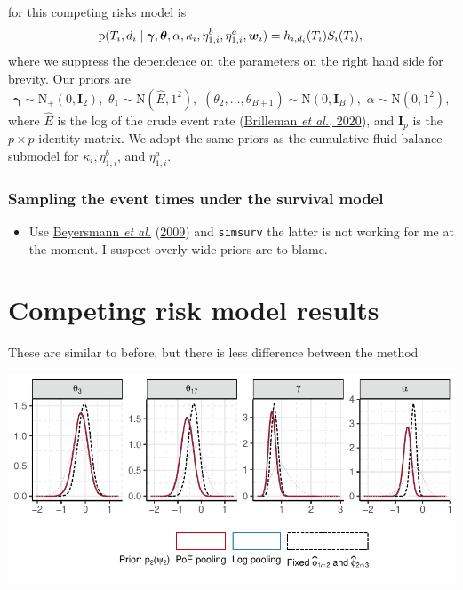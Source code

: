 \documentclass[
  10pt,
  a4paper,
]{article}
\providecommand{\tightlist}{%
  \setlength{\itemsep}{0pt}\setlength{\parskip}{0pt}}
\newcommand{\pd}{\text{p}}
\begin{document}
for this competing risks model is \begin{equation}
  \pd(T_{i}, d_{i} \mid \boldsymbol{\gamma}, \boldsymbol{\theta}, \alpha, \kappa_{i}, \eta_{1, i}^{b}, \eta_{1, i}^{a}, \boldsymbol{w}_{i}) = h_{i, d_{i}}(T_{i}) S_{i}(T_{i}), \\
\end{equation} where we suppress the dependence on the parameters on the
right hand side for brevity. Our priors are \begin{equation}
  \boldsymbol{\gamma} \sim \text{N}_{+}(0, \boldsymbol{I}_{2}), \, \,
  \theta_{1} \sim \text{N}(\hat{E}, 1^2), \, \,
  (\theta_{2}, \ldots, \theta_{B + 1}) \sim \text{N}(0, \boldsymbol{I}_{B}), \, \,
  \alpha \sim \text{N}(0, 1^2),
  \label{eqn:surv-submodel-prior-def}
\end{equation} where \(\hat{E}\) is the log of the crude event rate
(\protect\hyperlink{ref-brilleman_bayesian_2020}{Brilleman \emph{et
al.}, 2020}), and \(\boldsymbol{I}_{p}\) is the \(p \times p\) identity
matrix. We adopt the same priors as the cumulative fluid balance
submodel for \(\kappa_{i}, \eta_{1, i}^{b}\), and \(\eta_{1, i}^{a}\).

\hypertarget{sampling-the-event-times-under-the-survival-model}{%
\subsubsection{Sampling the event times under the survival
model}\label{sampling-the-event-times-under-the-survival-model}}

\begin{itemize}
\tightlist
\item
  Use \protect\hyperlink{ref-beyersmann_simulating_2009}{Beyersmann
  \emph{et al.}}
  (\protect\hyperlink{ref-beyersmann_simulating_2009}{2009}) and
  \texttt{simsurv} the latter is not working for me at the moment. I
  suspect overly wide priors are to blame.
\end{itemize}

\hypertarget{competing-risk-model-results}{%
\section{Competing risk model
results}\label{competing-risk-model-results}}

These are similar to before, but there is less difference between the
method

\begin{center}\includegraphics{../plots/mimic-example/psi-2-method-comparison-small} \end{center}
\end{document}
